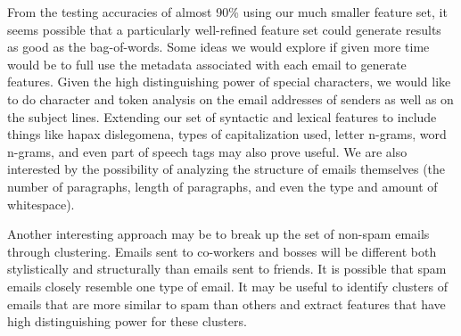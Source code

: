 \documentclass{article} %
\begin{document}
From the testing accuracies of almost 90\% using our much smaller feature set, it seems possible that a particularly well-refined feature set could generate results as good as the bag-of-words. Some ideas we would explore if given more time would be to full use the metadata associated with each email to generate features. Given the high distinguishing power of special characters, we would like to do character and token analysis on the email addresses of senders as well as on the subject lines. Extending our set of syntactic and lexical features to include things like hapax dislegomena, types of capitalization used, letter n-grams, word n-grams, and even part of speech tags may also prove useful.  We are also interested by the possibility of analyzing the structure of emails themselves (the number of paragraphs, length of paragraphs, and even the type and amount of whitespace).\par
Another interesting approach may be to break up the set of non-spam emails through clustering. Emails sent to co-workers and bosses will be different both stylistically and structurally than emails sent to friends. It is possible that spam emails closely resemble one type of email. It may be useful to identify clusters of emails that are more similar to spam than others and extract features that have high distinguishing power for these clusters.
\end{document}
